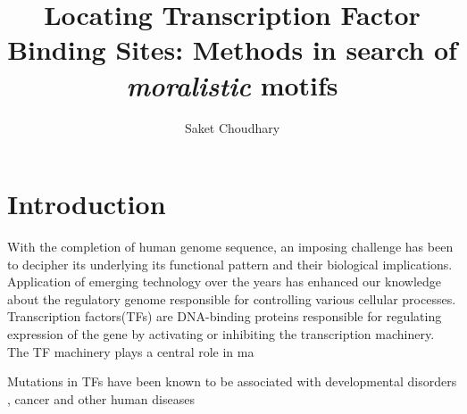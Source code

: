 \documentclass[a4paper,11pt]{article}
\title{Locating Transcription Factor Binding Sites: Methods in search of \textit{moralistic} motifs}
\author{Saket Choudhary}
\begin{document}
\maketitle
\section*{Introduction}

With the completion of human genome sequence\cite{lander_initial_2001}, an imposing challenge has been to decipher its underlying its functional pattern and their biological implications. Application of emerging technology over the years has enhanced our knowledge about the regulatory genome responsible for controlling various cellular processes. Transcription factors(TFs) are DNA-binding proteins responsible for regulating expression of the gene by activating or inhibiting the transcription machinery. The TF machinery plays a central role in ma

Mutations in TFs have been known to be associated with developmental disorders \cite{epstein_transcription-factor_1996}, cancer\cite{furney_structural_2006} and other human diseases \cite{medzhitov_transcriptional_2009,sage_regulatory_2010}






\end{document}
